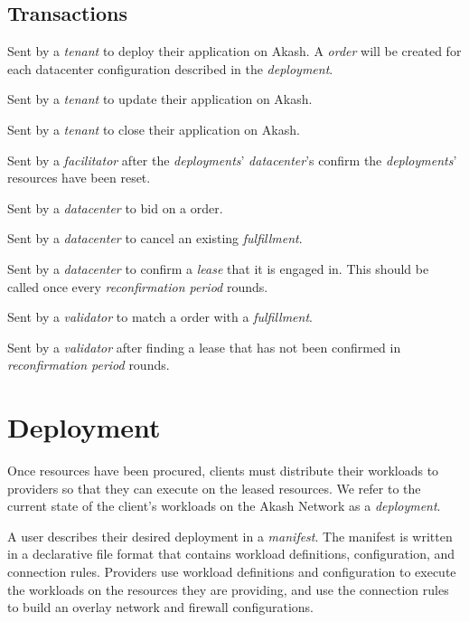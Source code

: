 \documentclass[11pt,english]{article}
\theoremstyle{definition}
\begin{document}
\subsection{Transactions}
\begin{description}
	\item [SubmitDeployment] Sent by a \textit{tenant} to deploy their application on Akash. A \textit{order} will be created for each datacenter configuration described in the \textit{deployment}.
	\item [UpdateDeployment] Sent by a \textit{tenant} to update their application on Akash.
	\item [CloseDeployment] Sent by a \textit{tenant} to close their application on Akash.
	\item [DeploymentClosed] Sent by a \textit{facilitator} after the \textit{deployments}' \textit{datacenter}'s confirm the \textit{deployments}' resources have been reset.
	\item [SubmitFulfillment] Sent by a \textit{datacenter} to bid on a order.
	\item [CancelFulfillment] Sent by a \textit{datacenter} to cancel an existing \textit{fulfillment}.
	\item [SubmitLeaseConfirmation] Sent by a \textit{datacenter} to confirm a \textit{lease} that it is engaged in. This should be called once every \textit{reconfirmation period} rounds.
	\item [SubmitLease] Sent by a \textit{validator} to match a order with a \textit{fulfillment}.
	\item [SubmitStaleLease] Sent by a \textit{validator} after finding a lease that has not been confirmed in \textit{reconfirmation period} rounds.
	\item 
\end{description}

\section{Deployment}
Once resources have been procured, clients must distribute their workloads to providers so that they can execute on the leased resources.  We refer to the current state of the client's workloads on the Akash Network as a \textit{deployment}.

A user describes their desired deployment in a \textit{manifest}.  The manifest is written in a declarative file format that contains workload definitions, configuration, and connection rules.  Providers use workload definitions and configuration to execute the workloads on the resources they are providing, and use the connection rules to build an overlay network and firewall configurations.
\end{document}
